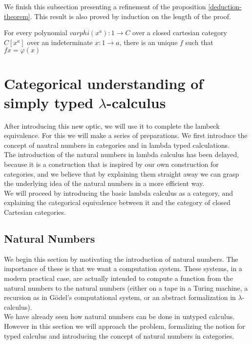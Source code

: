 We finish this subsection presenting a refinement of the proposition \ref{deduction-theorem}. This result is also proved by induction on the length of the proof.

\begin{proposition}
  For every polynomial $varphi(x^a): 1\to C$ over a closed cartesian category $C[x^a]$ over an indeterminate $x:1\to a$, there is an unique $f$ such that $fx=\varphi(x)$
\end{proposition}
\section{Categorical understanding of simply typed $\lambda$-calculus}
After introducing this new optic, we will use it to complete the lambeck equivalence. For this we will make a series of preparations. We first introduce the concept of nautral numbers in categories and in lambda typed calculations.\\

The introduction of the natural numbers in lambda calculus has been delayed, because it is a construction that is inspired by our own construction for categories, and we believe that by explaining them straight away we can grasp the underlying idea of the natural numbers in a more efficient way.\\

We will proceed by introducing the basic lambda calculus as a category, and explaining the categorical equivalence between it and the category of closed Cartesian categories.

\subsection{Natural Numbers}


We begin this section by motivating the introduction of natural numbers. The importance of these is that we want a computation system. These systems, in a modern practical case, are actually intended to compute a function from the natural numbers to the natural numbers (either on a tape in a Turing machine, a recursion as in Gödel's computational system, or an abstract formalization in $\lambda$-calculus).\\

We have already seen how natural numbers can be done in untyped calculus. However in this section we will approach the problem, formalizing the notion for typed calculus and introducing the concept of natural numbers in categories.

